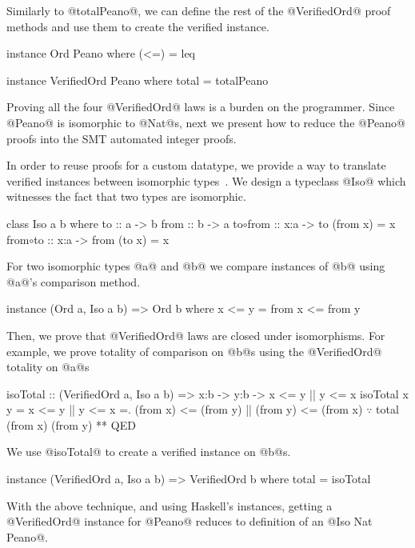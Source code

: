 Similarly to @totalPeano@, we can define the rest of the @VerifiedOrd@
proof methods and use them to create the verified instance.
%
\begin{code}
  instance Ord Peano where
    (<=) = leq

  instance VerifiedOrd Peano where
    total = totalPeano
\end{code}
%
Proving all the four @VerifiedOrd@ laws
is a burden on the programmer.
%
Since @Peano@ is isomorphic to @Nat@s,
next we present how
to reduce the @Peano@ proofs into the
SMT automated integer proofs.

%
In order to reuse proofs for a custom datatype,
we provide a way to translate verified instances between isomorphic types~\cite{barthe2001type}.
%
We design a typeclass @Iso@ which witnesses the fact that
two types are isomorphic.

\begin{mcode}
  class Iso a b where
    to      :: a -> b
    from    :: b -> a
    to$\circ$from :: x:a -> {to (from x) = x}
    from$\circ$to :: x:a -> {from (to x) = x}
\end{mcode}
%
For two isomorphic types @a@ and @b@
we compare instances of @b@ using @a@'s
comparison method.
%
\begin{mcode}
  instance (Ord a, Iso a b) => Ord b where
    x <= y = from x <= from y
\end{mcode}
%
Then, we prove that @VerifiedOrd@ laws are closed under isomorphisms.
%
For example, we prove totality of comparison on @b@s
using the @VerifiedOrd@ totality on @a@s

\begin{mcode}
  isoTotal :: (VerifiedOrd a, Iso a b) => x:b -> y:b -> {x <= y || y <= x}
  isoTotal x y
   =  x <= y || y <= x
   =. (from x) <= (from y) || (from y) <= (from x)
      $\because$ total (from x) (from y)
   ** QED
\end{mcode}
%
We use @isoTotal@ to create a verified instance on @b@s.
\begin{mcode}
  instance (VerifiedOrd a, Iso a b) => VerifiedOrd b where
    total   = isoTotal
\end{mcode}
%
With the above technique,
and using Haskell's instances,
getting a @VerifiedOrd@ instance for @Peano@
reduces to definition of an @Iso Nat Peano@.

